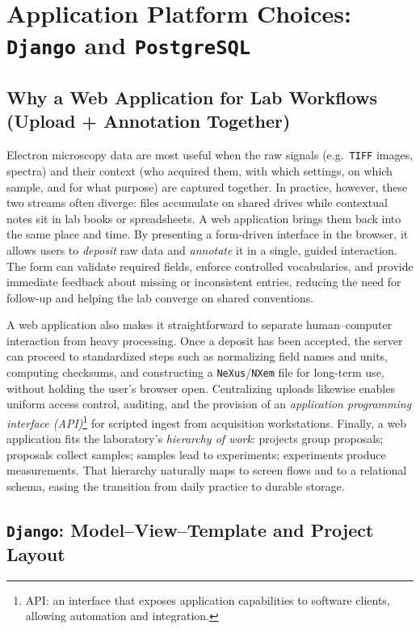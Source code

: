 \chapter{Application Platform Choices: \texttt{Django} and \texttt{PostgreSQL}}\label{chap:django}

\section{Why a Web Application for Lab Workflows (Upload + Annotation Together)}
Electron microscopy data are most useful when the raw signals (e.g.\ \texttt{TIFF} images, spectra) and their context (who acquired them, with which settings, on which sample, and for what purpose) are captured together. In practice, however, these two streams often diverge: files accumulate on shared drives while contextual notes sit in lab books or spreadsheets. A web application brings them back into the same place and time. By presenting a form-driven interface in the browser, it allows users to \emph{deposit} raw data and \emph{annotate} it in a single, guided interaction. The form can validate required fields, enforce controlled vocabularies, and provide immediate feedback about missing or inconsistent entries, reducing the need for follow-up and helping the lab converge on shared conventions.

\medskip
\noindent A web application also makes it straightforward to separate human–computer interaction from heavy processing. Once a deposit has been accepted, the server can proceed to standardized steps such as normalizing field names and units, computing checksums, and constructing a \texttt{NeXus}/\texttt{NXem} file for long-term use, without holding the user’s browser open. Centralizing uploads likewise enables uniform access control, auditing, and the provision of an \emph{application programming interface (API)}\footnote{API: an interface that exposes application capabilities to software clients, allowing automation and integration.} for scripted ingest from acquisition workstations. Finally, a web application fits the laboratory’s \emph{hierarchy of work}: projects group proposals; proposals collect samples; samples lead to experiments; experiments produce measurements. That hierarchy naturally maps to screen flows and to a relational schema, easing the transition from daily practice to durable storage.

\section{\texttt{Django}: Model–View–Template and Project Layout}

